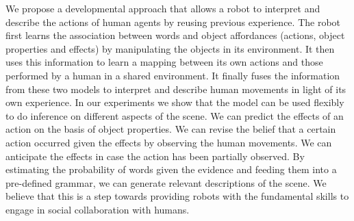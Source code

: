 We propose a developmental approach that allows a robot to interpret and describe the actions of human agents by reusing previous experience.
The robot first learns the association between words and object affordances (actions, object properties and effects) by manipulating the objects in its environment.
It then uses this information to learn a mapping between its own actions and those performed by a human in a shared environment.
It finally fuses the information from these two models to interpret and describe human movements in light of its own experience.
In our experiments we show that the model can be used flexibly to do inference on different aspects of the scene.
We can predict the effects of an action on the basis of object properties.
We can revise the belief that a certain action occurred given the effects by observing the human movements.
We can anticipate the effects in case the action has been partially observed.
By estimating the probability of words given the evidence and feeding them into a pre-defined grammar, we can generate relevant descriptions of the scene.
We believe that this is a step towards providing robots with the fundamental skills to engage in social collaboration with humans.
